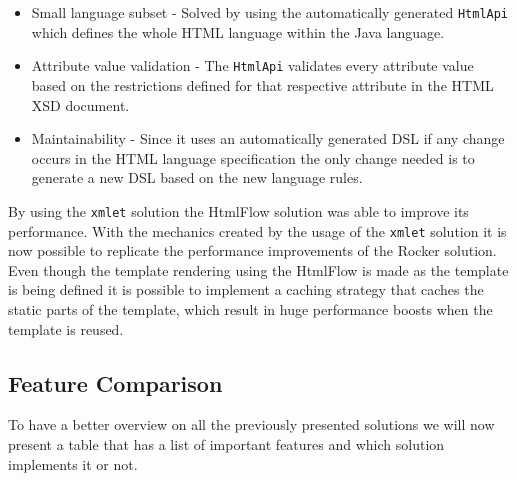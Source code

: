 \begin{itemize}
	\item Small language subset - Solved by using the automatically generated \texttt{HtmlApi} which defines the whole \ac{HTML} language within the Java language.
	\item Attribute value validation - The \texttt{HtmlApi} validates every attribute value based on the restrictions defined for that respective attribute in the \ac{HTML} \ac{XSD} document.
	\item Maintainability - Since it uses an automatically generated \ac{DSL} if any change occurs in the \ac{HTML} language specification the only change needed is to generate a new \ac{DSL} based on the new language rules.
\end{itemize}

\noindent
By using the \texttt{xmlet} solution the HtmlFlow solution was able to improve its performance. With the mechanics created by the usage of the \texttt{xmlet} solution it is now possible to replicate the performance improvements of the Rocker solution. Even though the template rendering using the HtmlFlow is made as the template is being defined it is possible to implement a caching strategy that caches the static parts of the template, which result in huge performance boosts when the template is reused.

\newpage

\subsection{Feature Comparison}
\label{sec:featurecomparison}

To have a better overview on all the previously presented solutions we will now present a table that has a list of important features and which solution implements it or not.


